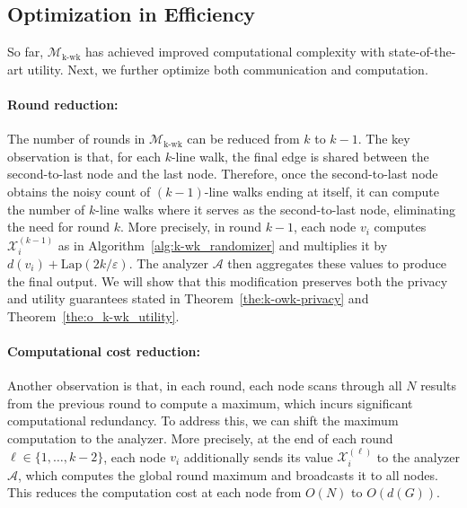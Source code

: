 \subsection{Optimization in Efficiency}
\label{subsec:opt_wk}


So far, $\mathcal{M}_{\mathrm{k\text{-}wk}}$ has achieved improved computational complexity with state-of-the-art utility. 
Next, we further optimize both communication and computation.


\paragraph{Round reduction:} 



The number of rounds in $\mathcal{M}_{\mathrm{k\text{-}wk}}$ can be reduced from $k$ to $k-1$. 
The key observation is that, for each $k$-line walk, the final edge is shared between the second-to-last node and the last node. 
Therefore, once the second-to-last node obtains the noisy count of $(k-1)$-line walks ending at itself, it can compute the number of $k$-line walks where it serves as the second-to-last node, eliminating the need for round $k$.
More precisely, in round $k-1$, each node $v_i$ computes $\mathcal{X}^{(k-1)}_i$ as in Algorithm~\ref{alg:k-wk_randomizer} and multiplies it by $d(v_i) + \mathrm{Lap}(2k/\varepsilon)$. 
The analyzer $\mathcal{A}$ then aggregates these values to produce the final output. 
We will show that this modification preserves both the privacy and utility guarantees stated in Theorem~\ref{the:k-owk-privacy} and Theorem~\ref{the:o_k-wk_utility}.



\paragraph{Computational cost reduction:} 




Another observation is that, in each round, each node scans through all $N$ results from the previous round to compute a maximum, which incurs significant computational redundancy. 
To address this, we can shift the maximum computation to the analyzer. 
More precisely, 
at the end of each round $\ell \in \{1, \dots, k-2\}$, each node $v_i$ additionally sends its value $\mathcal{X}^{(\ell)}_i$ to the analyzer $\mathcal{A}$, which computes the global round maximum and broadcasts it to all nodes. 
This reduces the computation cost at each node from $O(N)$ to $O(d(G))$.




